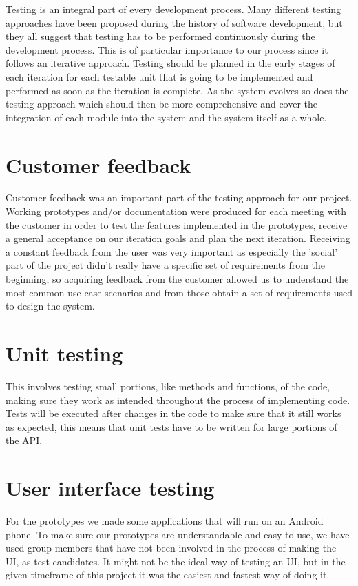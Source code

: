 
Testing is an integral part of every development process.
Many different testing approaches have been proposed during the history of
software development, but they all suggest that testing has to be performed continuously
during the development process. This is of particular importance to our process since
it follows an iterative approach. Testing should be planned in the early stages of each
iteration for each testable unit that is going to be implemented and performed as soon as
the iteration is complete. As the system evolves so does the testing approach which should
then be more comprehensive and cover the integration of each module into the system and the
system itself as a whole.

\section{Customer feedback}
Customer feedback was an important part of the testing approach for our project.
Working prototypes and/or documentation were produced for each meeting with the customer
in order to test the features implemented in the prototypes, receive a general acceptance
on our iteration goals and plan the next iteration. Receiving a constant feedback from the
user was very important as especially the 'social' part of the project didn't really have a
specific set of requirements from the beginning, so acquiring feedback from the customer allowed
us to understand the most common use case scenarios and from those obtain a set of requirements used
to design the system.

\section{Unit testing}
This involves testing small portions, like methods and functions, of the code, making sure they work 
as intended throughout the process of implementing code. Tests will be executed after changes in the 
code to make sure that it still works as expected, this means that unit tests have to be written for 
large portions of the API.

\section{User interface testing}
For the prototypes we made some applications that will run on an Android phone. To make sure our 
prototypes are understandable and easy to use, we have used group members that have not been 
involved in the process of making the UI, as test candidates. It might not be the ideal way of testing 
an UI, but in the given timeframe of this project it was the easiest and fastest way of doing it.

